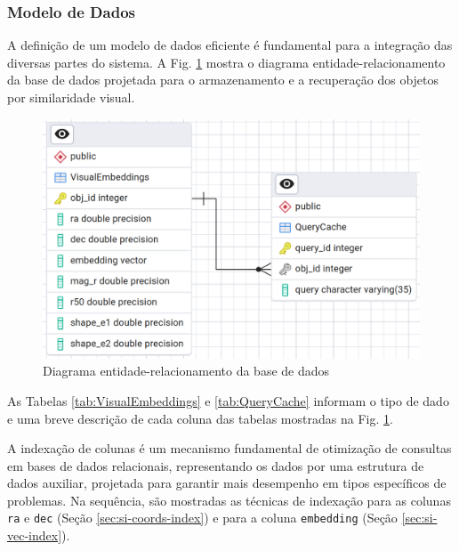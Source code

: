 \subsubsection{Modelo de Dados}
\label{sec:si-datamodel}

A definição de um modelo de dados eficiente é fundamental para a integração das diversas partes do sistema. A Fig. \ref{fig:db} mostra o diagrama entidade-relacionamento da base de dados projetada para o armazenamento e a recuperação dos objetos por similaridade visual.

\begin{figure}[!ht]
  \centering
  \caption{Diagrama entidade-relacionamento da base de dados}
  \label{fig:db}
  \includegraphics[width=\linewidth]{figures/database.png}
\end{figure}


As Tabelas \ref{tab:VisualEmbeddings} e \ref{tab:QueryCache} informam o tipo de dado e uma breve descrição de cada coluna das tabelas mostradas na Fig. \ref{fig:db}.

A indexação de colunas é um mecanismo fundamental de otimização de consultas em bases de dados relacionais, representando os dados por uma estrutura de dados auxiliar, projetada para garantir mais desempenho em tipos específicos de problemas. Na sequência, são mostradas as técnicas de indexação para as colunas \texttt{ra} e \texttt{dec} (Seção \ref{sec:si-coords-index}) e para a coluna \texttt{embedding} (Seção \ref{sec:si-vec-index}).

